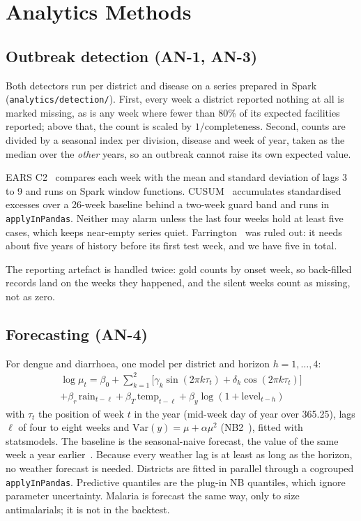 \section{Analytics Methods}
\subsection{Outbreak detection (AN-1, AN-3)}
Both detectors run per district and disease on a series prepared in Spark (\texttt{analytics/detection/}).
First, every week a district reported nothing at all is marked missing, as is any week where fewer than 80\% of
its expected facilities reported; above that, the count is scaled by $1/\text{completeness}$. Second, counts
are divided by a seasonal index per division, disease and week of year, taken as the median over the
\emph{other} years, so an outbreak cannot raise its own expected value.

EARS C2~\cite{hutwagner2003ears} compares each week with the mean and standard deviation of lags 3 to 9 and runs
on Spark window functions. CUSUM~\cite{page1954cusum} accumulates standardised excesses over a 26-week baseline behind a two-week
guard band and runs in \texttt{applyInPandas}. Neither may alarm unless the last four weeks hold at least five
cases, which keeps near-empty series quiet. Farrington~\cite{farrington1996} was ruled out: it needs about five
years of history before its first test week, and we have five in total.

The reporting artefact is handled twice: gold counts by onset week, so back-filled records land on the weeks
they happened, and the silent weeks count as missing, not as zero.

\subsection{Forecasting (AN-4)}
For dengue and diarrhoea, one model per district and horizon $h=1,\dots,4$:
\begin{multline}
\log\mu_t = \beta_0 + \textstyle\sum_{k=1}^{2} \bigl[\gamma_k \sin(2\pi k\tau_t) + \delta_k \cos(2\pi k\tau_t)\bigr] \\
+ \beta_r\,\text{rain}_{t-\ell} + \beta_T\,\text{temp}_{t-\ell} + \beta_y \log(1+\text{level}_{t-h})
\end{multline}
with $\tau_t$ the position of week $t$ in the year (mid-week day of year over 365.25), lags $\ell$ of four to eight weeks and $\text{Var}(y)=\mu+\alpha\mu^2$ (NB2~\cite{hilbe2011nb}), fitted with
statsmodels. The baseline is the seasonal-naive forecast, the value of the same week a year earlier~\cite{hyndman2021fpp3}.
Because every weather lag is at least as long as the horizon, no weather forecast is needed. Districts are
fitted in parallel through a cogrouped \texttt{applyInPandas}. Predictive quantiles are the plug-in NB
quantiles, which ignore parameter uncertainty. Malaria is forecast the same way, only to size antimalarials;
it is not in the backtest.

